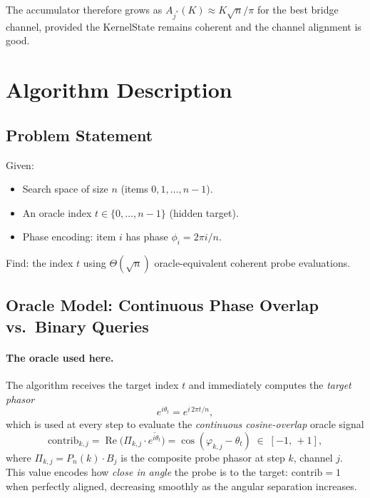 \documentclass[12pt,a4paper]{article}
\theoremstyle{plain}
\theoremstyle{definition}
\theoremstyle{remark}
\begin{document}
The accumulator therefore grows as $A_{j^*}(K) \approx K\sqrt{n}/\pi$
for the best bridge channel, provided the KernelState remains coherent
and the channel alignment is good.

\section{Algorithm Description}
\label{sec:algorithm}

\subsection{Problem Statement}

Given:
\begin{itemize}
  \item Search space of size $n$ (items $0, 1, \ldots, n-1$).
  \item An oracle index $t \in \{0,\ldots,n-1\}$ (hidden target).
  \item Phase encoding: item $i$ has phase $\phi_i = 2\pi i / n$.
\end{itemize}
Find: the index $t$ using $\Theta(\sqrt{n})$ oracle-equivalent coherent
probe evaluations.

\subsection{Oracle Model: Continuous Phase Overlap vs.\ Binary Queries}
\label{sec:oracle-model}

\paragraph{The oracle used here.}
The algorithm receives the target index $t$ and immediately computes the
\emph{target phasor}
\begin{equation}
  e^{i\theta_t} = e^{i\,2\pi t/n},
  \label{eq:target-phasor}
\end{equation}
which is used at every step to evaluate the \emph{continuous cosine-overlap}
oracle signal
\begin{equation}
  \mathrm{contrib}_{k,j}
    = \operatorname{Re}\!\bigl(\Pi_{k,j}\cdot\overline{e^{i\theta_t}}\bigr)
    = \cos(\varphi_{k,j} - \theta_t)
    \;\in\; [-1,\,+1],
  \label{eq:contrib}
\end{equation}
where $\Pi_{k,j} = P_n(k)\cdot B_j$ is the composite probe phasor at step $k$,
channel $j$.  This value encodes how \emph{close in angle} the probe is to the
target: $\mathrm{contrib} = 1$ when perfectly aligned, decreasing smoothly as
the angular separation increases.
\end{document}
